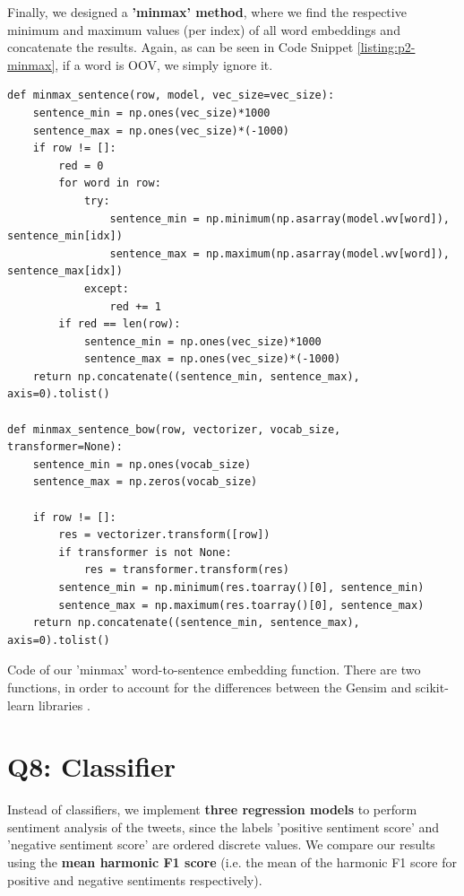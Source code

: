 Finally, we designed a \textbf{'minmax' method}, where we find the respective minimum and maximum values (per index) of all word embeddings and concatenate the results. Again, as can be seen in Code Snippet \ref{listing:p2-minmax}, if a word is OOV, we simply ignore it.

\begin{listing*}
\begin{verbatim}
def minmax_sentence(row, model, vec_size=vec_size):
    sentence_min = np.ones(vec_size)*1000
    sentence_max = np.ones(vec_size)*(-1000)
    if row != []:
        red = 0
        for word in row:
            try:
                sentence_min = np.minimum(np.asarray(model.wv[word]), sentence_min[idx])
                sentence_max = np.maximum(np.asarray(model.wv[word]), sentence_max[idx])
            except:
                red += 1
        if red == len(row):
            sentence_min = np.ones(vec_size)*1000
            sentence_max = np.ones(vec_size)*(-1000)
    return np.concatenate((sentence_min, sentence_max), axis=0).tolist()

def minmax_sentence_bow(row, vectorizer, vocab_size, transformer=None):
    sentence_min = np.ones(vocab_size)
    sentence_max = np.zeros(vocab_size)
    
    if row != []:
        res = vectorizer.transform([row])
        if transformer is not None:
            res = transformer.transform(res)
        sentence_min = np.minimum(res.toarray()[0], sentence_min)
        sentence_max = np.maximum(res.toarray()[0], sentence_max)
    return np.concatenate((sentence_min, sentence_max), axis=0).tolist()
\end{verbatim}
\caption{Code of our 'minmax' word-to-sentence embedding function. There are two functions, in order to account for the differences between the Gensim \cite{gensim} and scikit-learn libraries \cite{sklearn1, sklearn2}.}
\label{listing:p2-minmax}
\end{listing*}


\section*{Q8: Classifier}
Instead of classifiers, we implement \textbf{three regression models} to perform sentiment analysis of the tweets, since the labels 'positive sentiment score' and 'negative sentiment score' are ordered discrete values. We compare our results using the \textbf{mean harmonic F1 score} (i.e. the mean of the harmonic F1 score for positive and negative sentiments respectively).

